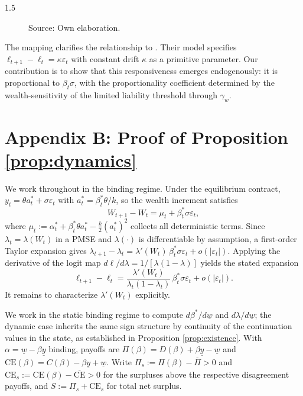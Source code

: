 \documentclass[12pt]{article}
\theoremstyle{definition}
\theoremstyle{plain}
\begin{document}
\begin{spacing}{1.5}
\begin{appendices}
\begin{figure}[htbp]
\caption*{Source: Own elaboration.}
\label{fig:reduced_form_mapping}
\end{figure}
    
    The mapping clarifies the relationship to \textcite{digiannatale2025}. Their model specifies $\ell_{t+1} - \ell_t = \kappa \varepsilon_t$ with constant drift $\kappa$ as a primitive parameter. Our contribution is to show that this responsiveness emerges endogenously: it is proportional to $\beta_t\sigma$, with the proportionality coefficient determined by the wealth-sensitivity of the limited liability threshold through $\gamma_w$.

    \section{Appendix B: Proof of Proposition \ref{prop:dynamics}} \label{ProofProp2}

    We work throughout in the binding regime. Under the equilibrium contract, $y_t = \theta a_t^* + \sigma\varepsilon_t$ with $a_t^* = \beta_t^*\theta/k$, so the wealth increment satisfies
    \[
    W_{t+1} - W_t = \mu_t + \beta_t^*\sigma\varepsilon_t,
    \]
    where $\mu_t := \alpha_t^* + \beta_t^*\theta a_t^* - \frac{k}{2}(a_t^*)^2$ collects all deterministic terms. Since $\lambda_t = \lambda(W_t)$ in a PMSE and $\lambda(\cdot)$ is differentiable by assumption, a first-order Taylor expansion gives $\lambda_{t+1} - \lambda_t = \lambda'(W_t)\,\beta_t^*\sigma\varepsilon_t + o(|\varepsilon_t|)$. Applying the derivative of the logit map $d\ell/d\lambda = 1/[\lambda(1-\lambda)]$ yields the stated expansion
    \[
    \ell_{t+1} - \ell_t = \frac{\lambda'(W_t)}{\lambda_t(1-\lambda_t)}\,\beta_t^*\sigma\varepsilon_t + o(|\varepsilon_t|).
    \]
    It remains to characterize $\lambda'(W_t)$ explicitly.

    We work in the static binding regime to compute $d\beta^*/d\underline{w}$ and $d\lambda/d\underline{w}$; the dynamic case inherits the same sign structure by continuity of the continuation values in the state, as established in Proposition \ref{prop:existence}. With $\alpha = \underline{w} - \beta\underline{y}$ binding, payoffs are $\Pi(\beta) = D(\beta) + \beta\underline{y} - \underline{w}$ and $\mathrm{CE}(\beta) = C(\beta) - \beta\underline{y} + \underline{w}$. Write $\Pi_s := \Pi(\beta) - \overline{\Pi} > 0$ and $\mathrm{CE}_s := \mathrm{CE}(\beta) - \overline{\text{CE}} > 0$ for the surpluses above the respective disagreement payoffs, and $S := \Pi_s + \mathrm{CE}_s$ for total net surplus.


\end{appendices}
\end{spacing}
\end{document}
